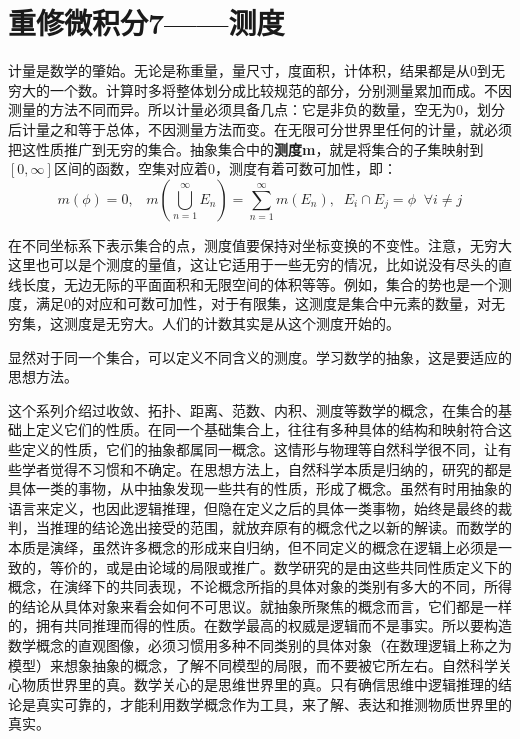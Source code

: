\chapter{重修微积分7——测度}

计量是数学的肇始。无论是称重量，量尺寸，度面积，计体积，结果都是从0到无穷大的一个数。计算时多将整体划分成比较规范的部分，分别测量累加而成。不因测量的方法不同而异。所以计量必须具备几点：它是非负的数量，空无为0，划分后计量之和等于总体，不因测量方法而变。在无限可分世界里任何的计量，就必须把这性质推广到无穷的集合。抽象集合中的\textbf{测度m}，就是将集合的子集映射到$ [0,\infty] $区间的函数，空集对应着0，测度有着可数可加性，即：
\begin{equation}
	m(\phi )=0,\;\;\; m(\bigcup_{n=1}^\infty  E_n)=\sum _{n=1}^{\infty} m(E_n),\;\; E_i \cap E_j =\phi\;\;\forall i\neq j
\end{equation}

在不同坐标系下表示集合的点，测度值要保持对坐标变换的不变性。注意，无穷大这里也可以是个测度的量值，这让它适用于一些无穷的情况，比如说没有尽头的直线长度，无边无际的平面面积和无限空间的体积等等。例如，集合的势也是一个测度，满足0的对应和可数可加性，对于有限集，这测度是集合中元素的数量，对无穷集，这测度是无穷大。人们的计数其实是从这个测度开始的。

显然对于同一个集合，可以定义不同含义的测度。学习数学的抽象，这是要适应的思想方法。

这个系列介绍过收敛、拓扑、距离、范数、内积、测度等数学的概念，在集合的基础上定义它们的性质。在同一个基础集合上，往往有多种具体的结构和映射符合这些定义的性质，它们的抽象都属同一概念。这情形与物理等自然科学很不同，让有些学者觉得不习惯和不确定。在思想方法上，自然科学本质是归纳的，研究的都是具体一类的事物，从中抽象发现一些共有的性质，形成了概念。虽然有时用抽象的语言来定义，也因此逻辑推理，但隐在定义之后的具体一类事物，始终是最终的裁判，当推理的结论逸出接受的范围，就放弃原有的概念代之以新的解读。而数学的本质是演绎，虽然许多概念的形成来自归纳，但不同定义的概念在逻辑上必须是一致的，等价的，或是由论域的局限或推广。数学研究的是由这些共同性质定义下的概念，在演绎下的共同表现，不论概念所指的具体对象的类别有多大的不同，所得的结论从具体对象来看会如何不可思议。就抽象所聚焦的概念而言，它们都是一样的，拥有共同推理而得的性质。在数学最高的权威是逻辑而不是事实。所以要构造数学概念的直观图像，必须习惯用多种不同类别的具体对象（在数理逻辑上称之为模型）来想象抽象的概念，了解不同模型的局限，而不要被它所左右。自然科学关心物质世界里的真。数学关心的是思维世界里的真。只有确信思维中逻辑推理的结论是真实可靠的，才能利用数学概念作为工具，来了解、表达和推测物质世界里的真实。

